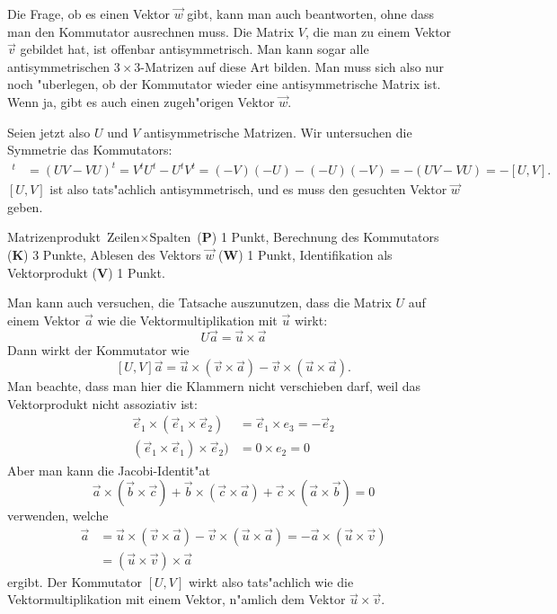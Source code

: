 \begin{diskussion}
Die Frage, ob es einen Vektor $\vec w$ gibt, kann man auch beantworten,
ohne dass man den Kommutator ausrechnen muss. Die Matrix $V$, die man zu
einem Vektor $\vec v$ gebildet hat, ist offenbar antisymmetrisch.
Man kann sogar alle antisymmetrischen $3\times 3$-Matrizen auf diese
Art bilden. Man muss sich also nur noch "uberlegen, ob der Kommutator
wieder eine antisymmetrische Matrix ist. Wenn ja, gibt es auch einen
zugeh"origen Vektor $\vec w$.

Seien jetzt also $U$ und $V$ antisymmetrische Matrizen. Wir untersuchen
die Symmetrie das Kommutators:
\begin{align*}
[U,V]^t
&=
(UV-VU)^t
=
V^tU^t-U^tV^t
=
(-V)(-U)-(-U)(-V)
=
-(UV-VU)
=
-[U,V].
\end{align*}
$[U,V]$ ist also tats"achlich antisymmetrisch, und es muss den gesuchten
Vektor $\vec w$ geben.
\end{diskussion}

\begin{bewertung}
Matrizenprodukt $\text{Zeilen}\times \text{Spalten}$ ({\bf P}) 1 Punkt,
Berechnung des Kommutators ({\bf K}) 3 Punkte,
Ablesen des Vektors $\vec w$ ({\bf W}) 1 Punkt,
Identifikation als Vektorprodukt ({\bf V}) 1 Punkt.
\end{bewertung}

\begin{diskussion}
Man kann auch versuchen, die Tatsache auszunutzen, dass die Matrix $U$
auf einem Vektor $\vec a$ wie die Vektormultiplikation mit $\vec u$
wirkt:
\[
U\vec a=\vec u\times \vec a
\]
Dann wirkt der Kommutator wie
\[
[U,V]\vec a
=
\vec u\times (\vec v\times \vec a)-\vec v\times(\vec u\times \vec a).
\]
Man beachte, dass man hier die Klammern nicht verschieben darf, weil
das Vektorprodukt nicht assoziativ ist:
\begin{align*}
\vec e_1\times(\vec e_1\times\vec e_2)&=\vec e_1\times e_3=-\vec e_2\\
(\vec e_1\times\vec e_1)\times\vec e_2)&=0\times e_2=0
\end{align*}
Aber man kann die Jacobi-Identit"at
\[
\vec a\times(\vec b\times \vec c)
+
\vec b\times(\vec c\times \vec a)
+
\vec c\times(\vec a\times \vec b)
=
0
\]
verwenden, welche
\begin{align*}
[U,V]\vec a
&=
\vec u\times (\vec v\times \vec a)-\vec v\times(\vec u\times \vec a)
=
-\vec a\times(\vec u\times \vec v)
\\
&=
(\vec u\times \vec v)\times\vec a
\end{align*}
ergibt.
Der Kommutator $[U,V]$ wirkt also tats"achlich wie die Vektormultiplikation
mit einem Vektor, n"amlich dem Vektor $\vec u\times \vec v$.
\end{diskussion}



